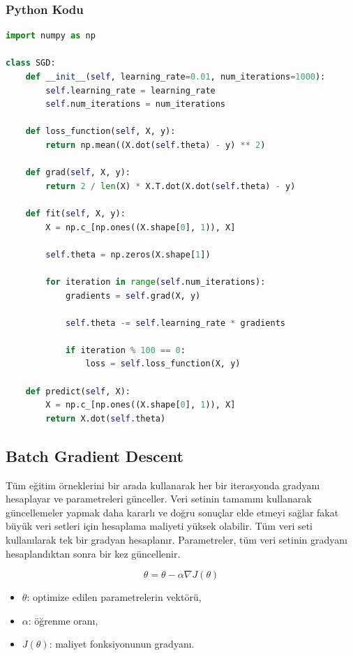 \subsubsection{Python Kodu}

\begin{lstlisting}[language=Python]
import numpy as np

class SGD:
    def __init__(self, learning_rate=0.01, num_iterations=1000):
        self.learning_rate = learning_rate
        self.num_iterations = num_iterations

    def loss_function(self, X, y):
        return np.mean((X.dot(self.theta) - y) ** 2)

    def grad(self, X, y):
        return 2 / len(X) * X.T.dot(X.dot(self.theta) - y)
    
    def fit(self, X, y):
        X = np.c_[np.ones((X.shape[0], 1)), X]

        self.theta = np.zeros(X.shape[1])

        for iteration in range(self.num_iterations):
            gradients = self.grad(X, y)

            self.theta -= self.learning_rate * gradients

            if iteration % 100 == 0:
                loss = self.loss_function(X, y)

    def predict(self, X):
        X = np.c_[np.ones((X.shape[0], 1)), X]
        return X.dot(self.theta)
\end{lstlisting}

\newpage

\subsection{Batch Gradient Descent}

Tüm eğitim örneklerini bir arada kullanarak her bir iterasyonda gradyanı hesaplayar ve parametreleri günceller. Veri setinin tamamını kullanarak güncellemeler yapmak daha kararlı ve doğru sonuçlar elde etmeyi sağlar fakat büyük veri setleri için hesaplama maliyeti yüksek olabilir. Tüm veri seti kullanılarak tek bir gradyan hesaplanır. Parametreler, tüm veri setinin gradyanı hesaplandıktan sonra bir kez güncellenir.

\[\theta = \theta - \alpha \nabla J(\theta)\]

\begin{itemize}
	\item $\theta$: optimize edilen parametrelerin vektörü,
	\item $\alpha$: öğrenme oranı,
	\item $J(\theta)$: maliyet fonksiyonunun gradyanı.
\end{itemize}

